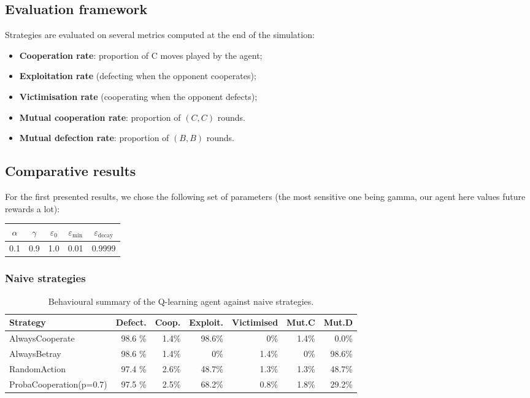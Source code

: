 \documentclass[11pt, a4paper]{article}
\begin{document}
\subsection{Evaluation framework}

Strategies are evaluated on several metrics computed at the end of the simulation:
\begin{itemize}
  \item \textbf{Cooperation rate}: proportion of C moves played by the agent;
  \item \textbf{Exploitation rate} (defecting when the opponent cooperates);
  \item \textbf{Victimisation rate} (cooperating when the opponent defects);
  \item \textbf{Mutual cooperation rate}: proportion of $(C, C)$ rounds.
  \item \textbf{Mutual defection rate}: proportion of $(B, B)$ rounds.
\end{itemize}

\subsection{Comparative results}

For the first presented results, we chose the following set of parameters (the most sensitive one being gamma, our agent here values future rewards a lot):
\begin{center}
  \begin{tabular}{ccccc}
    \toprule
    $\alpha$ & $\gamma$ & $\varepsilon_0$ & $\varepsilon_{\min}$ & $\varepsilon_{\text{decay}}$ \\
    \midrule
    0.1 & 0.9 & 1.0 & 0.01 & 0.9999 \\
    \bottomrule
  \end{tabular}
\end{center}

\subsubsection{Naive strategies}

\begin{table}[H]
  \centering
  \caption{Behavioural summary of the Q-learning agent against naive strategies.}
  \label{tab:results}
  \begin{tabular}{lrr||rrrr}
    \toprule
    Strategy & Defect. & Coop. & Exploit. & Victimised & Mut.C & Mut.D\\
    \midrule
    
    AlwaysCooperate     & 98.6 \% & 1.4\% & 98.6\% & 0\% & 1.4\% & 0.0\%  \\
    AlwaysBetray        & 98.6 \%& 1.4\% & 0\% & 1.4\% & 0\% & 98.6\%  \\
    RandomAction        & 97.4 \%& 2.6\% & 48.7\% & 1.3\% & 1.3\% & 48.7\%  \\
    ProbaCooperation(p=0.7)   & 97.5 \% & 2.5\% & 68.2\% & 0.8\% & 1.8\% & 29.2\%  \\
    \bottomrule
  \end{tabular}
\end{table}
\end{document}
